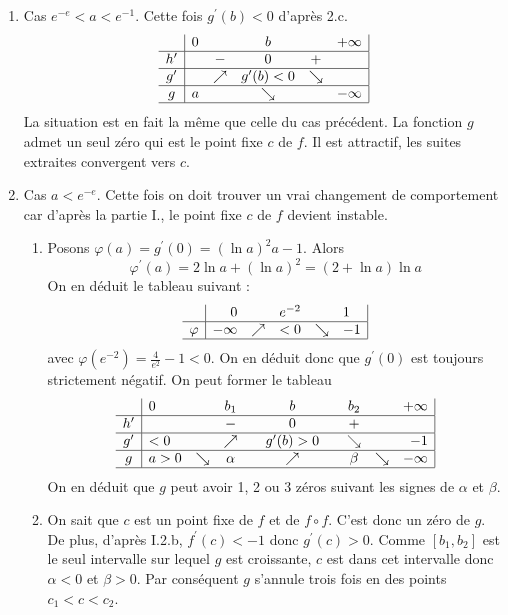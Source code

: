 \begin{enumerate}
\item Cas $e^{-e}<a<e^{-1}$. Cette fois $g^\prime(b)<0$ d'après 2.c.
\[
\begin{array}{c|lcccr|}
 & 0 & & b & & +\infty \\ \hline
h^\prime & & - & 0 & + & \\ \hline
g^\prime & & \nearrow & g^\prime (b)<0 & \searrow & \\ \hline
g & a &  & \searrow  & & -\infty \\
\hline 
\end{array}
\]
La situation est en fait la même que celle du cas précédent. La fonction $g$ admet un seul zéro qui est le point fixe $c$ de $f$. Il est attractif, les suites extraites convergent vers $c$.
\item Cas $a<e^{-e}$. Cette fois on doit trouver un vrai changement de comportement car d'après la partie I., le point fixe $c$ de $f$ devient instable.
\begin{enumerate}
\item Posons $\varphi(a)=g^\prime(0)=(\ln a)^2a-1$. Alors 
\begin{displaymath}
\varphi^\prime(a)=2\ln a +(\ln a)^2 = (2+\ln a)\ln a 
\end{displaymath}
On en déduit le tableau suivant :
\[
\begin{array}{c|rcccl|}
 & 0 & & e^{-2} & & 1 \\ \hline
\varphi & -\infty & \nearrow & <0 & \searrow & -1 \\
\hline
\end{array}
\]
avec $\varphi(e^{-2})=\frac{4}{e^{2}}-1<0$. On en déduit donc que $g^\prime(0)$ est toujours strictement négatif.
On peut former le tableau
\[
\begin{array}{c|lcccccccr|}
         & 0 &        & b_1     & & b           & & b_2    &        & +\infty \\ \hline
h^\prime &   &        & -       & & 0           & & +      &        &         \\ \hline
g^\prime &<0 &        & \nearrow& &g^\prime(b)>0& &\searrow&        &-1 \\ \hline
g        &a>0&\searrow&\alpha   & &\nearrow     & &\beta   &\searrow&-\infty \\
\hline
\end{array}
\]
On en déduit que $g$ peut avoir 1, 2 ou 3 zéros suivant les signes de $\alpha$ et $\beta$.
\item On sait que $c$ est un point fixe de $f$ et de $f\circ f$. C'est donc un zéro de $g$. De plus, d'après I.2.b, $f^\prime(c)<-1$ donc $g^\prime(c)>0$. Comme $[b_1,b_2]$ est le seul intervalle sur lequel $g$ est croissante, $c$ est dans cet intervalle donc $\alpha<0$ et $\beta>0$. Par conséquent $g$ s'annule trois fois en des points $c_1<c<c_2$.

\end{enumerate}
\end{enumerate}
